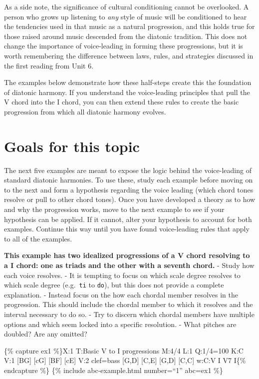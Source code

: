 \documentclass{book}
\begin{document}
As a side note, the significance of cultural conditioning cannot be
overlooked. A person who grows up listening to \emph{any} style of music will
be conditioned to hear the tendencies used in that music as a natural
progression, and this holds true for those raised around music descended from
the diatonic tradition. This does not change the importance of voice-leading
in forming these progressions, but it is worth remembering the difference
between laws, rules, and strategies discussed in the first reading from Unit
6.

The examples below demonstrate how these half-steps create this the foundation
of diatonic harmony. If you understand the voice-leading principles that pull
the V chord into the I chord, you can then extend these rules to create the
basic progression from which all diatonic harmony evolves.

\hypertarget{goals-for-this-topic}{%
\section{Goals for this topic}\label{goals-for-this-topic}}

The next five examples are meant to expose the logic behind the voice-leading
of standard diatonic harmonies. To use these, study each example before moving
on to the next and form a hypothesis regarding the voice leading (which chord
tones resolve or pull to other chord tones). Once you have developed a theory
as to how and why the progression works, move to the next example to see if
your hypothesis can be applied. If it cannot, alter your hypothesis to account
for both examples. Continue this way until you have found voice-leading rules
that apply to all of the examples.

\textbf{This example has two idealized progressions of a V chord resolving to
a I chord: one as triads and the other with a seventh chord.} - Study how each
voice resolves. - It is tempting to focus on which scale degree resolves to
which scale degree (e.g.~\texttt{ti} to \texttt{do}), but this does not
provide a complete explanation. - Instead focus on the how each chordal member
resolves in the progression. This should include the chordal member to which
it resolves and the interval necessary to do so. - Try to discern which
chordal members have multiple options and which seem locked into a specific
resolution. - What pitches are doubled? Are any omitted?

\{\% capture ex1 \%\}X:1 T:Basic V to I progressions M:4/4 L:1 Q:1/4=100 K:C
V:1 {[}BG{]}\textbar{} {[}cG{]}\textbar\textbar{} {[}BF{]}\textbar{}
{[}cE{]}\textbar{]} V:2 clef=bass {[}G,D{]}\textbar{}
{[}C,E{]}\textbar\textbar{} {[}G,D{]}\textbar{} {[}C,C{]}\textbar{]} w:C:V I
V7 I\{\% endcapture \%\} \{\% include abc-example.html number=``1'' abc=ex1
\%\}
\end{document}
